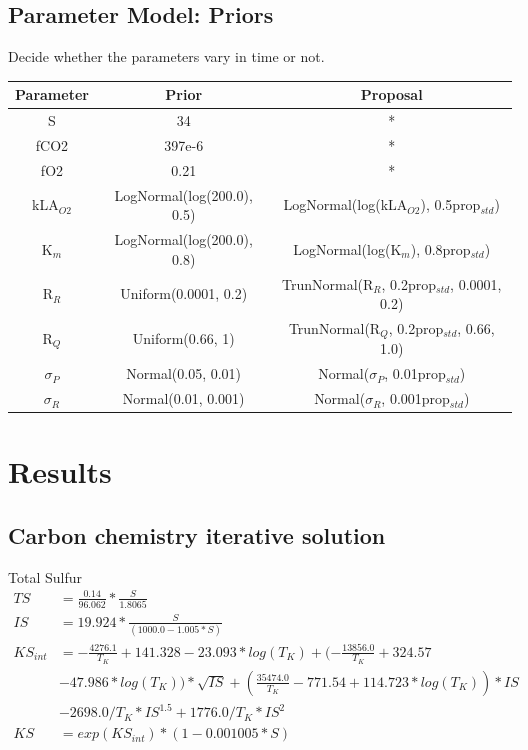 \documentclass{ruthesis}
\begin{document}
\subsection{Parameter Model: Priors}
Decide whether the parameters vary in time or not.




\begin{tabular}{c | c  |  c}
	Parameter & Prior &  Proposal \\ \hline
	S  & 34 & * \\
	fCO2  & 397e-6 &  *  \\
	fO2  & 0.21 &  *  \\
	kLA$_{O2}$  & LogNormal(log(200.0), 0.5)  & LogNormal(log(kLA$_{O2}$), 0.5prop$_{std}$) \\
	K$_m$ &  LogNormal(log(200.0), 0.8)  & LogNormal(log(K$_m$), 0.8prop$_{std}$) \\
	R$_R$  & Uniform(0.0001, 0.2) &  TrunNormal(R$_R$, 0.2prop$_{std}$, 0.0001, 0.2) \\
	R$_Q$  & Uniform(0.66, 1) &  TrunNormal(R$_Q$, 0.2prop$_{std}$, 0.66, 1.0)
	 \\
	$\sigma_P$ & Normal(0.05, 0.01) & Normal($\sigma_P$, 0.01prop$_{std}$) \\
	$\sigma_R$ & Normal(0.01, 0.001) & Normal($\sigma_R$, 0.001prop$_{std}$) \\
	
\end{tabular}
\newpage


\FloatBarrier

\section{Results}


\subsection{Carbon chemistry iterative solution}

Total Sulfur
\begin{align*}
 TS     	&= \frac{0.14}{96.062}*\frac{S}{1.8065} \nonumber \\
 IS     	&= 19.924*\frac{S}{(1000.0 - 1.005*S)} \nonumber \\
 KS_{int} 	&= -\frac{4276.1}{T_K} + 141.328 - 23.093*log(T_K) + (-\frac{13856.0}{T_K} + 324.57 \nonumber\\ 			 
 			& - 47.986*log(T_K))*\sqrt{IS} + ( \frac{35474.0}{T_K} - 771.54  + 114.723*log(T_K))*IS \nonumber \\
 			& - 2698.0/T_K*IS^{1.5} + 1776.0/T_K*IS^2 \nonumber \\
 KS     	&= exp(KS_{int})*(1 - 0.001005*S) \nonumber \\
\end{align*}
\end{document}
